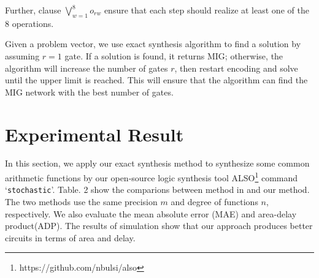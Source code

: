 \documentclass[conference,letterpaper]{IEEEtran}
\begin{document}
Further, clause $\bigvee_{w=1}^{8} o_{r w}$ ensure that each step should realize at least one of the 8 operations.

Given a problem vector, we use exact synthesis algorithm to find a solution by assuming $r= 1$ gate. If a solution is found, it returns MIG; otherwise, the algorithm will increase the number of gates $r$, then restart encoding and solve until the upper limit is reached. This will ensure that the algorithm can find the MIG network with the best number of gates.


\section*{Experimental Result}
In this section, we apply our exact synthesis method to synthesize some common arithmetic functions by our open-source logic synthesis tool ALSO\footnote{https://github.com/nbulsi/also} command `\texttt{stochastic}'. Table. 2 show the comparions between method in\cite{2} and our method.
The two methods use the same precision $m$ and degree of functions $n$, respectively. We also evaluate the mean absolute error (MAE) and area-delay product(ADP). The results of simulation show that our approach produces better circuits in terms of area and delay.
\end{document}

